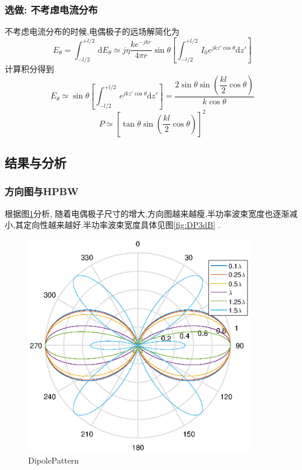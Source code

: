 \subsubsection{选做: 不考虑电流分布}
不考虑电流分布的时候,电偶极子的远场解简化为
\begin{equation}
	E_\theta=\int_{-l/2}^{+l/2}\,\mathrm{d}E_\theta\simeq j\eta\dfrac{ke^{-jkr}}{4\pi r}\sin\theta\left[\int_{-l/2}^{+l/2}\,I_0e^{jkz'\cos\theta}\mathrm{d}z'\right]
\end{equation}
计算积分得到
\begin{equation}
	E_\theta\simeq\sin\theta\left[ \int_{-l/2}^{+l/2}\,e^{jkz'\cos\theta}\mathrm{d}z' \right] =\dfrac{2\sin\theta\sin \left(\dfrac{kl}{2}\cos\theta\right)}{k\cos\theta}
\end{equation}
\begin{equation}
P\simeq \left[\tan\theta\sin\left(\dfrac{kl}{2}\cos\theta\right)\right]^2
\end{equation}
\subsection{结果与分析}
\subsubsection{方向图与HPBW}
根据图\ref{fig:DP}分析, 随着电偶极子尺寸的增大,方向图越来越瘦,半功率波束宽度也逐渐减小,其定向性越来越好.半功率波束宽度具体见图\ref{fig:DP3dB} .

\begin{figure}[!ht]
\centering
\includegraphics[width=10cm]{DipolePattern.eps}
\caption{DipolePattern} \label{fig:DP}
\end{figure}

